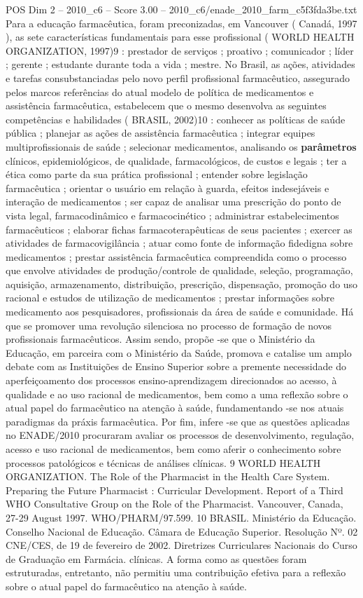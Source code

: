 \begin{textsample}{POS Dim 2 – 2010\_c6 – Score 3.00 – 2010\_c6/enade\_2010\_farm\_c5f3fda3be.txt}
Para a educação farmacêutica, foram preconizadas, em Vancouver ( Canadá, 1997 ), as sete características fundamentais para esse profissional ( WORLD HEALTH ORGANIZATION, 1997)9 : prestador de serviços ; proativo ; comunicador ; líder ; gerente ; estudante durante toda a vida ; mestre.
No Brasil, as ações, atividades e tarefas consubstanciadas pelo novo perfil profissional farmacêutico, assegurado pelos marcos referências do atual modelo de política de medicamentos e assistência farmacêutica, estabelecem que o mesmo desenvolva as seguintes competências e habilidades ( BRASIL, 2002)10 : conhecer as políticas de saúde pública ; planejar as ações de assistência farmacêutica ; integrar equipes multiprofissionais de saúde ; selecionar medicamentos, analisando os \textbf{parâmetros} clínicos, epidemiológicos, de qualidade, farmacológicos, de custos e legais ; ter a ética como parte da sua prática profissional ; entender sobre legislação farmacêutica ; orientar o usuário em relação à guarda, efeitos indesejáveis e interação de medicamentos ; ser capaz de analisar uma prescrição do ponto de vista legal, farmacodinâmico e farmacocinético ; administrar estabelecimentos farmacêuticos ; elaborar fichas farmacoterapêuticas de seus pacientes ; exercer as atividades de farmacovigilância ; atuar como fonte de informação fidedigna sobre medicamentos ; prestar assistência farmacêutica compreendida como o processo que envolve atividades de produção/controle de qualidade, seleção, programação, aquisição, armazenamento, distribuição, prescrição, dispensação, promoção do uso racional e estudos de utilização de medicamentos ; prestar informações sobre medicamento aos pesquisadores, profissionais da área de saúde e comunidade.
Há que se promover uma revolução silenciosa no processo de formação de novos profissionais farmacêuticos.
Assim sendo, propõe -se que o Ministério da Educação, em parceira com o Ministério da Saúde, promova e catalise um amplo debate com as Instituições de Ensino Superior sobre a premente necessidade do aperfeiçoamento dos processos ensino-aprendizagem direcionados ao acesso, à qualidade e ao uso racional de medicamentos, bem como a uma reflexão sobre o atual papel do farmacêutico na atenção à saúde, fundamentando -se nos atuais paradigmas da práxis farmacêutica.
Por fim, infere -se que as questões aplicadas no ENADE/2010 procuraram avaliar os processos de desenvolvimento, regulação, acesso e uso racional de medicamentos, bem como aferir o conhecimento sobre processos patológicos e técnicas de análises clínicas. 9 WORLD HEALTH ORGANIZATION.
The Role of the Pharmacist in the Health Care System.
Preparing the Future Pharmacist : Curricular Development.
Report of a Third WHO Consultative Group on the Role of the Pharmacist.
Vancouver, Canada, 27-29 August 1997.
WHO/PHARM/97.599. 10 BRASIL.
Ministério da Educação.
Conselho Nacional de Educação.
Câmara de Educação Superior.
Resolução Nº. 02 CNE/CES, de 19 de fevereiro de 2002.
Diretrizes Curriculares Nacionais do Curso de Graduação em Farmácia. clínicas.
A forma como as questões foram estruturadas, entretanto, não permitiu uma contribuição efetiva para a reflexão sobre o atual papel do farmacêutico na atenção à saúde.


\end{textsample}
